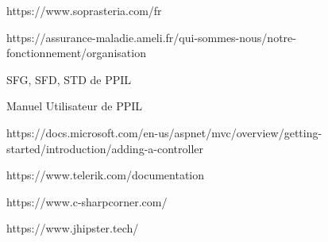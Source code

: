 \documentclass[a4paper,12pt]{book}
\makeatletter
\def\cleardoublepage{\clearpage\if@twoside \ifodd\c@page\else%
  \hbox{}%
  \thispagestyle{empty}%
  \newpage%
  \if@twocolumn\hbox{}\newpage\fi\fi\fi}
\theoremstyle{break}
\makeatother
\begin{document}

\mainmatter
\pagestyle{fancy}

\cleardoublepage








\appendix




https://www.soprasteria.com/fr

https://assurance-maladie.ameli.fr/qui-sommes-nous/notre-fonctionnement/organisation

SFG, SFD, STD de PPIL

Manuel Utilisateur de PPIL

https://docs.microsoft.com/en-us/aspnet/mvc/overview/getting-started/introduction/adding-a-controller

https://www.telerik.com/documentation

https://www.c-sharpcorner.com/

https://www.jhipster.tech/



%
\end{document}
